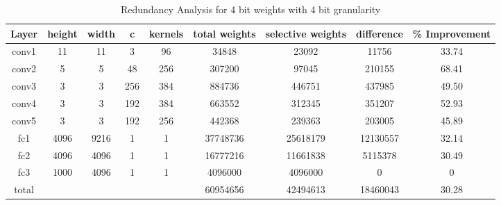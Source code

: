 \documentclass[conference]{IEEEtran}
\begin{document}
\begin{table}[!ht]
\centering
\caption{Redundancy Analysis for 4 bit weights with 4 bit granularity}
\label{Red_Anal}
\begin{tabular}{ccccccccc}
\hline
Layer & height    & width    & c   & kernels & total weights & selective weights  & difference & \% Improvement \\ \hline
conv1 & 11   & 11   & 3   & 96      & 34848         & 23092             & 11756      & 33.74          \\
conv2 & 5    & 5    & 48  & 256     & 307200        & 97045             & 210155     & 68.41          \\
conv3 & 3    & 3    & 256 & 384     & 884736        & 446751            & 437985     & 49.50          \\
conv4 & 3    & 3    & 192 & 384     & 663552        & 312345             & 351207     & 52.93          \\
conv5 & 3    & 3    & 192 & 256     & 442368        & 239363             & 203005     & 45.89          \\
fc1   & 4096 & 9216 & 1   & 1       & 37748736      & 25618179         & 12130557   & 32.14          \\
fc2   & 4096 & 4096 & 1   & 1       & 16777216      & 11661838          & 5115378    & 30.49          \\
fc3   & 1000 & 4096 & 1   & 1       & 4096000       & 4096000           & 0          & 0              \\ \hline
total &      &      &     &         & 60954656      & 42494613          & 18460043   & 30.28          \\ \hline
\end{tabular}
\end{table}
\end{document}

